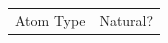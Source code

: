\begin{table}[!htbp]

\fontsize{7pt}{7pt}
\selectfont

\begin{tabular}{c|l}
Atom Type & Natural?\\

\end{tabular}
\end{table}

